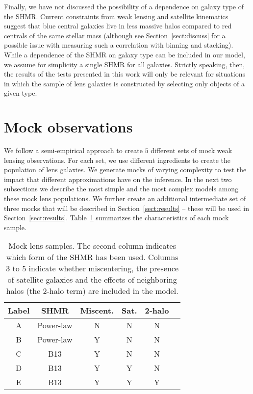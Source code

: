 \documentclass[usenatbib]{mnras}
\def\nmocks{5}
\def\Sref#1{Section~\ref{#1}\xspace}
\def\Tref#1{Table~\ref{#1}\xspace}
\begin{document}
Finally, we have not discussed the possibility of a dependence on galaxy type of the SHMR. Current constraints from weak lensing \citep{Man++16} and satellite kinematics \citep{Mor++11} suggest that blue central galaxies live in less massive halos compared to red centrals of the same stellar mass (although see \Sref{sect:discuss} for a possible issue with measuring such a correlation with binning and stacking).
While a dependence of the SHMR on galaxy type can be included in our model, we assume for simplicity a single SHMR for all galaxies. Strictly speaking, then, the results of the tests presented in this work will only be relevant for situations in which the sample of lens galaxies is constructed by selecting only objects of a given type. 



\section{Mock observations}\label{sect:mock}

We follow a semi-empirical approach to create $\nmocks$ different sets of mock weak lensing observations.
For each set, we use different ingredients to create the population of lens galaxies. We generate mocks of varying complexity to test the impact that different approximations have on the inference. In the next two subsections we describe the most simple and the most complex models among these mock lens populations. We further create an additional intermediate set of three mocks that will be described in \Sref{sect:results} -- these will be used in \Sref{sect:results}. 
\Tref{tab:mocks} summarizes the characteristics of each mock sample.
%
\begin{table}
 \caption{Mock lens samples. The second column indicates which form of the SHMR has been used. Columns 3 to 5 indicate whether miscentering, the presence of satellite galaxies and the effects of neighboring halos (the 2-halo term) are included in the model.}
 \label{tab:mocks}
 \begin{tabular}{cccccc}
 \hline
 Label & SHMR & Miscent. & Sat. & 2-halo\\
 \hline
A & Power-law & N & N & N \\
B & Power-law & Y & N & N \\
C & B13 & Y & N & N \\
D & B13 & Y & Y & N \\
E & B13 & Y & Y & Y \\
 \hline
 \end{tabular}
\end{table}
\end{document}
